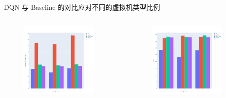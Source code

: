 \begin{frame}{DQN 与 Baseline 的对比}{应对不同的虚拟机类型比例}

    \begin{columns}


        \begin{figure}
            \centering
            \includegraphics[width=0.9\textwidth]{pics/vary_vm_resp.png}
        \end{figure}


        \begin{figure}
            \centering
            \includegraphics[width=0.9\textwidth]{pics/vary_vm_cost.png}
        \end{figure}

    \end{columns}

\end{frame}
